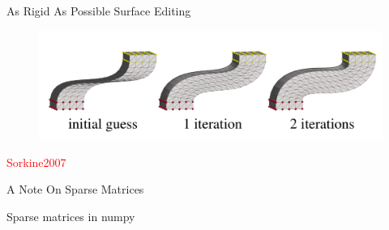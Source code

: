 \documentclass{beamer}
\begin{document}
\begin{frame}{As Rigid As Possible Surface Editing}

\begin{figure}[t]
    \includegraphics[width=\textwidth]{Sorkine07_1.png}
\end{figure}


\textcolor{red}{Sorkine2007}

\end{frame}


\begin{frame}{A Note On Sparse Matrices}

Sparse matrices in numpy

\end{frame}
\end{document}
